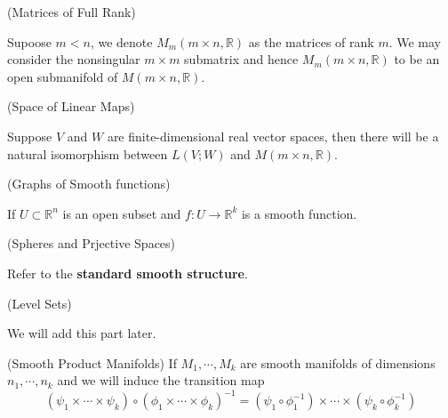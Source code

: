 \begin{example}(Matrices of Full Rank)\par
    Supoose $m<n$, we denote $M_m(m\times n,\mathbb{R})$ as the matrices of rank $m$. We may consider the nonsingular $m\times m$ submatrix and hence $M_m(m\times n, \mathbb{R})$ to be an open submanifold of $M(m\times n,\mathbb{R})$.
\end{example}

\begin{example}(Space of Linear Maps)\par
    Suppose $V$ and $W$ are finite-dimensional real vector spaces, then there will be a natural isomorphism between $L(V;W)$ and $M(m\times n,\mathbb{R})$.
\end{example}

\begin{example}(Graphs of Smooth functions)\par
    If $U\subset \mathbb{R}^n$ is an open subset and $f:U\to\mathbb{R}^k$ is a smooth function.
\end{example}

\begin{example}(Spheres and Prjective Spaces)\par
    Refer to the \textbf{standard smooth structure}.
\end{example}

\begin{example}(Level Sets)\par
    We will add this part later.
\end{example}

\begin{example}(Smooth Product Manifolds)
    If $M_1,\cdots,M_k$ are smooth manifolds of dimensions $n_1,\cdots,n_k$ and we will induce the transition map\[
    (\psi_1\times\cdots\times\psi_k) \circ (\phi_1\times\cdots\times\phi_k)^{-1} = (\psi_1\circ\phi_1^{-1})\times\cdots\times(\psi_k\circ \phi_k^{-1})
    \]    
\end{example}

